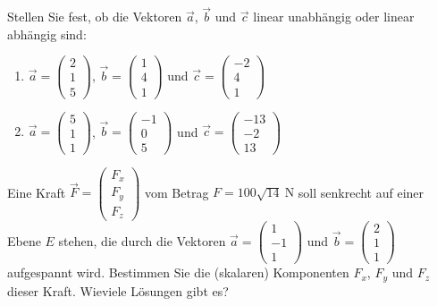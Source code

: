 \begin{ejercicio}
    Stellen Sie fest, ob die Vektoren $\vec{a}$, $\vec{b}$ und $\vec{c}$ linear unabhängig oder linear abhängig sind:
    \begin{enumerate}
        \item $\vec{a} = \begin{pmatrix}
            2\\
            1\\
            5
        \end{pmatrix}$, $\vec{b} = \begin{pmatrix}
            1\\
            4\\
            1
        \end{pmatrix}$ und $\vec{c} = \begin{pmatrix}
            -2\\
            4\\
            1
        \end{pmatrix}$
        \item $\vec{a} = \begin{pmatrix}
            5\\
            1\\
            1
        \end{pmatrix}$, $\vec{b} = \begin{pmatrix}
            -1\\
            0\\
            5
        \end{pmatrix}$ und $\vec{c} = \begin{pmatrix}
            -13\\
            -2\\
            13
        \end{pmatrix}$
    \end{enumerate}
\end{ejercicio}

\begin{ejercicio}
    Eine Kraft $\vec{F} = \begin{pmatrix}
        F_x\\
        F_y\\
        F_z
    \end{pmatrix}$ vom Betrag $F = 100\sqrt{14} \ \mathrm{N}$ soll senkrecht auf einer Ebene $E$ stehen, die durch die Vektoren $\vec{a} = \begin{pmatrix}
        1\\
        -1\\
        1
    \end{pmatrix}$ und $\vec{b} = \begin{pmatrix}
        2\\
        1\\
        1
    \end{pmatrix}$ aufgespannt wird.
    Bestimmen Sie die (skalaren) Komponenten $F_x$, $F_y$ und $F_z$ dieser Kraft. Wieviele Lösungen gibt es?
\end{ejercicio}

